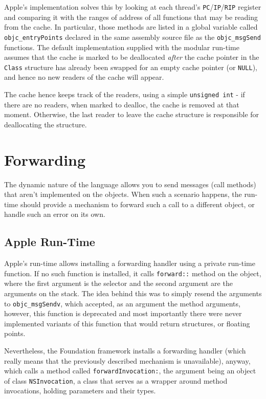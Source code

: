 Apple's implementation solves this by looking at each thread's \verb=PC=/\verb=IP=/\verb=RIP= register and comparing it with the ranges of address of all functions that may be reading from the cache. In particular, those methods are listed in a global variable called \verb=objc_entryPoints= declared in the same assembly source file as the \verb=objc_msgSend= functions. The default implementation supplied with the modular run-time assumes that the cache is marked to be deallocated \emph{after} the cache pointer in the \verb=Class= structure has already been swapped for an empty cache pointer (or \verb=NULL=), and hence no new readers of the cache will appear.

The cache hence keeps track of the readers, using a simple \verb=unsigned int= - if there are no readers, when marked to dealloc, the cache is removed at that moment. Otherwise, the last reader to leave the cache structure is responsible for deallocating the structure.

\section{Forwarding}

The dynamic nature of the language allows you to send messages (call methods) that aren't implemented on the objects. When such a scenario happens, the run-time should provide a mechanism to forward such a call to a different object, or handle such an error on its own.

\subsection{Apple Run-Time}

Apple's run-time allows installing a forwarding handler using a private run-time function. If no such function is installed, it calls \verb=forward::= method on the object, where the first argument is the selector and the second argument are the arguments on the stack. The idea behind this was to simply resend the arguments to \verb=objc_msgSendv=, which accepted, as an argument the method arguments, however, this function is deprecated and most importantly there were never implemented variants of this function that would return structures, or floating points.

Nevertheless, the Foundation framework installs a forwarding handler (which really means that the previously described mechanism is unavailable), anyway, which calls a method called \verb=forwardInvocation:=, the argument being an object of class \verb=NSInvocation=, a class that serves as a wrapper around method invocations, holding parameters and their types.

